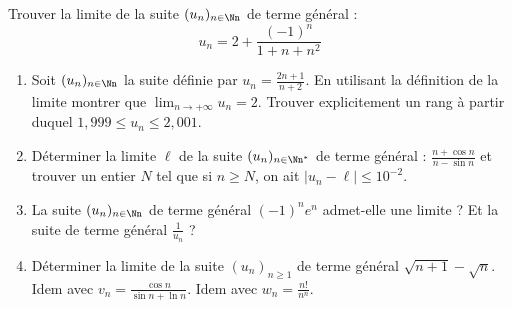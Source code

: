 \documentclass[class=report,crop=false]{standalone}
\begin{document}
\begin{exemple}
Trouver la limite de la suite $(u_n)_{n\in \Nn}$ de terme général :
\[u_n =2 +\frac{(-1)^n}{1+n+n^2}\]
\end{exemple}





\begin{miniexercices}
\sauteligne
\begin{enumerate}
  \item Soit $(u_n)_{n\in \Nn}$ la suite définie par $u_n = \frac{2n+1}{n+2}$.
En utilisant la définition de la limite montrer que $\lim_{n\to+\infty} u_n = 2$.
Trouver explicitement un rang à partir duquel $1,999 \le u_n \le 2,001$.

    \item  Déterminer la limite $\ell$ de la suite $(u_n)_{n\in \Nn^*}$ de terme général :
$\frac{n+\cos n}{n-\sin n}$ et trouver un entier $N$
tel que si $n\geq N$, on ait $|u_n-\ell|\leq 10^{-2}$.

  \item La suite $(u_n)_{n\in \Nn}$ de terme général $(-1)^ne^{n}$ admet-elle une limite ?
Et la suite de terme général $\frac{1}{u_n}$ ?

  \item  Déterminer la limite de la suite $(u_n)_{n\geq 1}$ de terme général $\sqrt{n+1}-\sqrt{n}$.
   Idem avec $v_n = \frac{\cos n}{\sin n + \ln n}$. Idem avec $w_n=\frac{n!}{n^n}$.


\end{enumerate}
\end{miniexercices}

\end{document}
